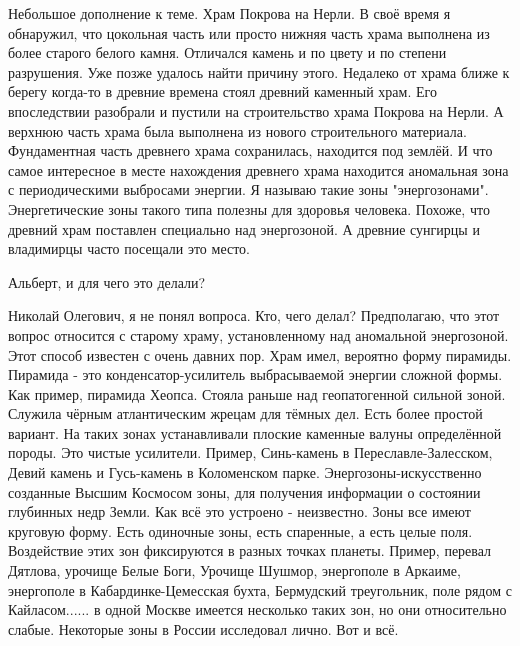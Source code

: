 \begin{itemize}


Небольшое дополнение к теме. Храм Покрова на Нерли. В своё время я обнаружил,
что цокольная часть или просто нижняя часть храма выполнена из более старого
белого камня. Отличался камень и по цвету и по степени разрушения. Уже позже
удалось найти причину этого. Недалеко от храма ближе к берегу когда-то в
древние времена стоял древний каменный храм. Его впоследствии разобрали и
пустили на строительство храма Покрова на Нерли. А верхнюю часть храма была
выполнена из нового строительного материала. Фундаментная часть древнего храма
сохранилась, находится под землёй. И что самое интересное в месте нахождения
древнего храма находится аномальная зона с периодическими выбросами энергии. Я
называю такие зоны "энергозонами". Энергетические зоны такого типа полезны для
здоровья человека. Похоже, что древний храм поставлен специально над
энергозоной. А древние сунгирцы и владимирцы часто посещали это место.


Альберт, и для чего это делали?


Николай Олегович, я не понял вопроса. Кто, чего делал? Предполагаю, что этот
вопрос относится с старому храму, установленному над аномальной энергозоной.
Этот способ известен с очень давних пор. Храм имел, вероятно форму пирамиды.
Пирамида - это конденсатор-усилитель выбрасываемой энергии сложной формы. Как
пример, пирамида Хеопса. Стояла раньше над геопатогенной сильной зоной. Служила
чёрным атлантическим жрецам для тёмных дел. Есть более простой вариант. На
таких зонах устанавливали плоские каменные валуны определённой породы. Это
чистые усилители. Пример, Синь-камень в Переславле-Залесском, Девий камень и
Гусь-камень в Коломенском парке. Энергозоны-искусственно созданные Высшим
Космосом зоны, для получения информации о состоянии глубинных недр Земли. Как
всё это устроено - неизвестно. Зоны все имеют круговую форму. Есть одиночные
зоны, есть спаренные, а есть целые поля. Воздействие этих зон фиксируются в
разных точках планеты. Пример, перевал Дятлова, урочище Белые Боги, Урочище
Шушмор, энергополе в Аркаиме, энергополе в Кабардинке-Цемесская бухта,
Бермудский треугольник, поле рядом с Кайласом...... в одной Москве имеется
несколько таких зон, но они относительно слабые. Некоторые зоны в России
исследовал лично. Вот и всё.



\end{itemize}
